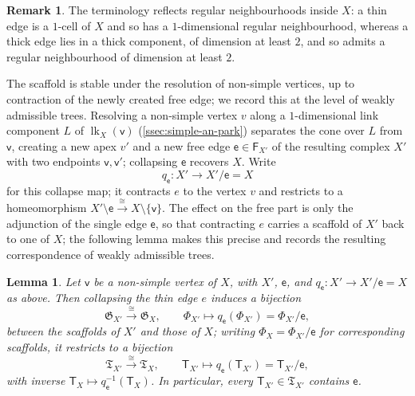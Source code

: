 \documentclass[reqno]{amsart}
\newtheorem{lemma}[theorem]{Lemma}
\theoremstyle{definition}
\newtheorem{remark}[theorem]{Remark}
\newcommand\frG{\mathfrak{G}}
\newcommand\frT{\mathfrak{T}}
\newcommand\sfT{\mathsf{T}}
\newcommand\sfe{\mathsf{e}}
\newcommand\sfv{\mathsf{v}}
\DeclareMathOperator{\lk}{lk}
\numberwithin{equation}{section}
\begin{document}
\begin{remark}
The terminology reflects regular neighbourhoods inside \(X\): a
thin edge is a \(1\)-cell of \(X\) and so has a \(1\)-dimensional
regular neighbourhood, whereas a thick edge lies in a thick
component, of dimension at least \(2\), and so admits a regular
neighbourhood of dimension at least \(2\).
\end{remark}




The scaffold is stable under the resolution of non-simple
vertices, up to contraction of the newly created free edge; we
record this at the level of weakly admissible trees. Resolving a
non-simple vertex \(v\) along a \(1\)-dimensional link component
\(L\) of \(\lk_X(\sfv)\) (\cref{ssec:simple-an-park}) separates
the cone over \(L\) from \(\sfv\), creating a new apex \(v'\) and a
new free edge \(\sfe\in\mathsf{F}_{X'}\) of the resulting complex
\(X'\) with two endpoints \(\sfv,\sfv'\); collapsing \(\sfe\) recovers \(X\). Write
\[
q_\sfe\colon X'\longrightarrow X'/\sfe = X
\]
for this collapse map; it contracts \(e\) to the vertex \(v\) and
restricts to a homeomorphism
\(X'\setminus \sfe\xrightarrow\cong X\setminus\{\sfv\}\). The effect
on the free part is only the adjunction of the single edge \(\sfe\),
so that contracting \(e\) carries a scaffold of \(X'\) back to
one of \(X\); the following lemma makes this precise and records
the resulting correspondence of weakly admissible trees.

\begin{lemma}\label{lem:max-tree-resolution}
Let \(\sfv\) be a non-simple vertex of \(X\), with \(X'\), \(\sfe\), and
\(q_\sfe\colon X'\to X'/\sfe=X\) as above. Then collapsing the thin edge
\(e\) induces a bijection
\[
\frG_{X'}\xrightarrow\cong\frG_X,
\qquad
\Phi_{X'}\longmapsto q_\sfe(\Phi_{X'})=\Phi_{X'}/\sfe,
\]
between the scaffolds of \(X'\) and those of \(X\); writing
\(\Phi_X=\Phi_{X'}/\sfe\) for corresponding scaffolds, it restricts
to a bijection
\[
\frT_{X'}\xrightarrow\cong\frT_X,
\qquad
\sfT_{X'}\longmapsto q_\sfe(\sfT_{X'})=\sfT_{X'}/\sfe,
\]
with inverse \(\sfT_X\mapsto q_\sfe^{-1}(\sfT_X)\). In particular, every
\(\sfT_{X'}\in\frT_{X'}\) contains \(\sfe\).
\end{lemma}
\end{document}
